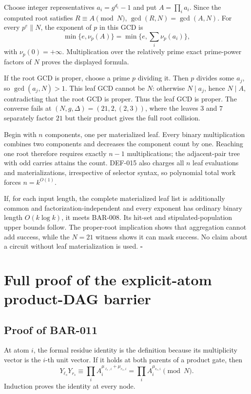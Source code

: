 \documentclass[11pt]{article}
\begin{document}
Choose integer representatives \(a_i=g^{d_i}-1\) and put
\(A=\prod_i a_i\). Since the computed root satisfies \(R\equiv A\pmod N\),
\(\gcd(R,N)=\gcd(A,N)\). For every \(p^e\parallel N\), the exponent of \(p\)
in this GCD is
\[
\min\{e,\nu_p(A)\}
=\min\{e,\sum_i\nu_p(a_i)\},
\tag{30}
\]
with \(\nu_p(0)=+\infty\). Multiplication over the relatively prime exact
prime-power factors of \(N\) proves the displayed formula.

If the root GCD is proper, choose a prime \(p\) dividing it. Then \(p\)
divides some \(a_j\), so \(\gcd(a_j,N)>1\). This leaf GCD cannot be \(N\):
otherwise \(N\mid a_j\), hence \(N\mid A\), contradicting that the root GCD
is proper. Thus the leaf GCD is proper. The converse fails at
\((N,g,\Delta)=(21,2,(2,3))\), where the leaves \(3\) and \(7\) separately
factor \(21\) but their product gives the full root collision.

Begin with \(n\) components, one per materialized leaf. Every binary
multiplication combines two components and decreases the component count by
one. Reaching one root therefore requires exactly \(n-1\) multiplications;
the adjacent-pair tree with odd carries attains the count. DEF-015 also
charges all \(n\) leaf evaluations and materializations, irrespective of
selector syntax, so polynomial total work forces \(n=k^{O(1)}\).

If, for each input length, the complete materialized leaf list is additionally
common and factorization-independent and every exponent has ordinary binary
length \(O(k\log k)\), it meets BAR-008. Its hit-set and stipulated-population
upper bounds follow. The proper-root implication shows that aggregation
cannot add success, while the \(N=21\) witness shows it can mask success. No
claim about a circuit without leaf materialization is used. \(\square\)

\section{Full proof of the explicit-atom product-DAG barrier}

\subsection{Proof of BAR-011}\label{proof:BAR-011}

At atom \(i\), the formal residue identity is the definition because its
multiplicity vector is the \(i\)-th unit vector. If it holds at both parents
of a product gate, then
\[
Y_{\ell_s}Y_{r_s}
\equiv
\prod_i A_i^{\mu_{\ell_s,i}+\mu_{r_s,i}}
=
\prod_i A_i^{\mu_{v_s,i}}
\pmod N.
\tag{31}
\]
Induction proves the identity at every node.
\end{document}
